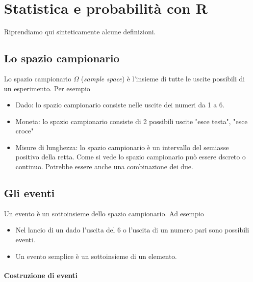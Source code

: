 \documentclass[onecolumn,12pt]{book}\usepackage[]{graphicx}\usepackage[]{color}
\begin{document}
\chapter{Statistica e probabilit\`a  con \textsf{R}}
Riprendiamo qui sinteticamente alcune definizioni.
\section{Lo spazio campionario}

Lo spazio campionario $\Omega$  (\emph{sample space}) è l'insieme di tutte le uscite possibili di un esperimento. Per esempio 
\begin{itemize}
\item Dado: lo spazio campionario consiste nelle uscite dei numeri da 1 a 6. \item Moneta: lo spazio campionario consiste di 2 possibili  uscite "esce testa", "esce croce"
\item Misure di lunghezza: lo spazio campionario è un intervallo del semiasse positivo della retta. 
Come si vede lo spazio campionario pu\`o essere dscreto o continuo. Potrebbe essere anche una combinazione dei due.
\end{itemize}
\section{Gli eventi}


 Un evento è un sottoinsieme dello spazio campionario. 
 Ad esempio
\begin{itemize}
\item Nel lancio di un dado l'uscita del 6 o l'uscita di un numero pari sono possibili eventi. 
\item Un evento semplice è un sottoinsieme di un elemento.
\end{itemize}


\subsubsection{Costruzione di eventi}
\end{document}
